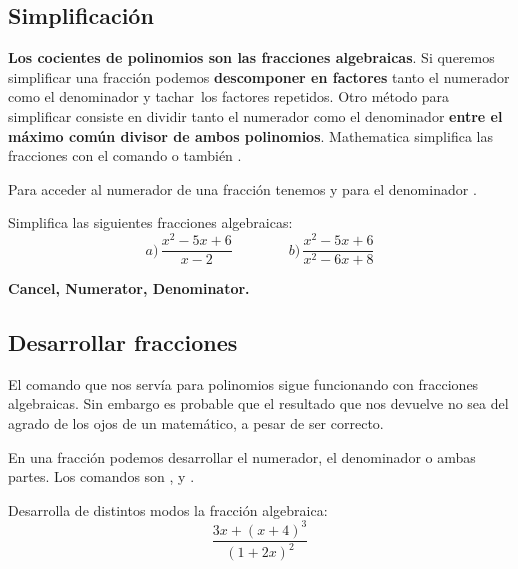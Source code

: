 \documentclass[a4paper,10pt, draft]{article}
\newcommand{\com}[1]{\textbf{\color{blue}{#1}}}
\newenvironment{ejer}{\begin{tcolorbox}[center title, title=Ejercicios,
fonttitle=\sffamily\bfseries,colback=blue!5,colframe=orange]}{\end{tcolorbox}}
\newenvironment{funciones}{\begin{tcolorbox}[center title, title=Nuevas funciones, fonttitle=\sffamily\bfseries, colback=green!5!white,colframe=red!75!black]}{\end{tcolorbox}\bigskip}
\begin{document}
\subsection{Simplificación}

\textbf{Los cocientes de polinomios son las fracciones algebraicas}. Si queremos simplificar una fracción podemos \textbf{descomponer en factores} tanto el numerador como el denominador y \guillemotleft tachar\guillemotright\ los factores repetidos. Otro método para simplificar consiste en dividir tanto el numerador como el denominador \textbf{entre el máximo común divisor de ambos polinomios}. Mathematica simplifica las fracciones con el comando  \com{Cancel[p]} o también \com{Simplify[p]}.

Para acceder al numerador de una fracción tenemos \com{Numerator[p]} y para el denominador \com{Denominator[p]}.

\begin{ejer}

Simplifica las siguientes fracciones algebraicas:
$$ 
a)\,\frac{x^2-5x+6}{x-2} \qquad \qquad b)\,\frac{x^2-5x+6}{x^2-6x+8}
$$

\end{ejer} 

\begin{funciones}

\textbf{Cancel, Numerator, Denominator.}

\end{funciones}

 \newpage

\subsection{Desarrollar fracciones}

El comando \com{Expand[p]} que nos servía para polinomios sigue funcionando con fracciones algebraicas. Sin  embargo es probable que el resultado que nos devuelve no sea del agrado de los ojos de un matemático, a pesar de ser correcto. 

En una fracción podemos desarrollar el numerador, el denominador o ambas partes. Los comandos son \com{ExpandNumerator[p]}, \com{ExpandDenominator[p]} y \com{ExpandAll[p]}.

\begin{ejer}

Desarrolla de distintos modos la  fracción algebraica:
$$
\frac{3x+(x+4)^3}{(1+2x)^2}
$$

\end{ejer}  
\end{document}

